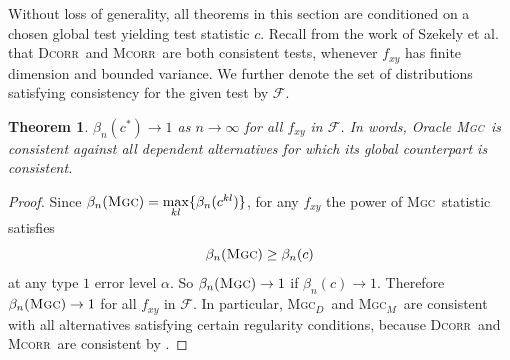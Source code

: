 \documentclass[11pt]{article}
\providecommand{\sct}[1]{{\normalfont\textsc{#1}}}
\providecommand{\mc}[1]{\mathcal{#1}}
\newcommand{\GG}{c}
\newcommand{\Mgc}{\sct{Mgc}}
\newcommand{\Mgcd}{\sct{Mgc$_D$}}
\newcommand{\Mgcm}{\sct{Mgc$_M$}}
\newcommand{\Dcorr}{\sct{Dcorr}}
\newcommand{\Mcorr}{\sct{Mcorr}}
\newcommand{\Mantel}{\sct{Mantel}}
\newtheorem{thm}{Theorem}
\begin{document}
Without loss of generality, all theorems in this section are conditioned on a chosen global test yielding test statistic $\GG$.
Recall from the work of Szekely et al. that \Dcorr~and \Mcorr~are both consistent tests, whenever $f_{xy}$ has finite dimension and bounded variance. We further denote the set of distributions satisfying consistency for the given test by $\mc{F}$.
\begin{thm}
\label{t:thm1}
$\beta_n(\GG^*) \rightarrow 1$ as $n \to \infty$ for all $f_{xy}$ in $\mc{F}$.
In words, Oracle \Mgc~is consistent against all dependent alternatives for which its global counterpart is consistent. 
\end{thm}
\begin{proof}
Since $\beta_n(\Mgc)=\underset{kl}{\max}\{\beta_n(\GG^{kl})\}$, for any $f_{xy}$ the power of \Mgc~statistic satisfies
\begin{equation*}
\beta_n(\Mgc) \geq \beta_n(\GG)
\end{equation*}
at any type $1$ error level $\alpha$. So $\beta_n(\Mgc) \rightarrow 1$ if $\beta_n(\GG) \rightarrow 1$.
% 
Therefore $\beta_n(\Mgc) \rightarrow 1$ for all $f_{xy}$ in $\mc{F}$. In particular, \Mgcd~and \Mgcm~are consistent with all alternatives satisfying certain regularity conditions, because \Dcorr~and \Mcorr~are consistent by \cite{SzekelyRizzoBakirov2007, SzekelyRizzo2013a}. 
\end{proof}
\end{document}
